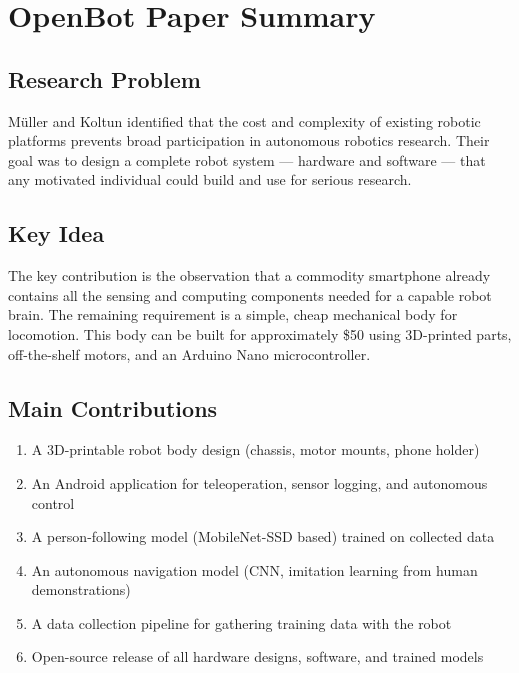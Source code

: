 \documentclass[12pt,a4paper]{article}
\begin{document}
\section{OpenBot Paper Summary}
\label{sec:paper_summary}

\subsection{Research Problem}

M\"{u}ller and Koltun \citep{openbot2021} identified that the cost and complexity of existing
robotic platforms prevents broad participation in autonomous robotics research. Their goal was
to design a complete robot system — hardware and software — that any motivated individual
could build and use for serious research.

\subsection{Key Idea}

The key contribution is the observation that a commodity smartphone already contains all the
sensing and computing components needed for a capable robot brain. The remaining requirement
is a simple, cheap mechanical body for locomotion. This body can be built for approximately
\$50 using 3D-printed parts, off-the-shelf motors, and an Arduino Nano microcontroller.

\subsection{Main Contributions}

\begin{enumerate}
    \item A 3D-printable robot body design (chassis, motor mounts, phone holder)
    \item An Android application for teleoperation, sensor logging, and autonomous control
    \item A person-following model (MobileNet-SSD based) trained on collected data
    \item An autonomous navigation model (CNN, imitation learning from human demonstrations)
    \item A data collection pipeline for gathering training data with the robot
    \item Open-source release of all hardware designs, software, and trained models
\end{enumerate}
\end{document}
